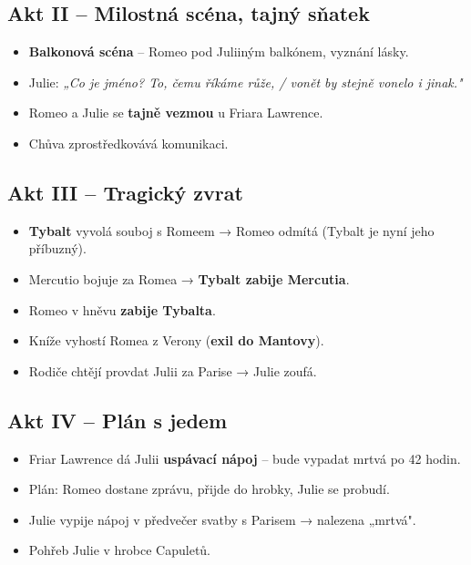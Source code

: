 \documentclass[12pt,a4paper]{article}
\begin{document}
\subsection{Akt II – Milostná scéna, tajný sňatek}
\begin{itemize}[leftmargin=1.5em]
  \item \textbf{Balkonová scéna} – Romeo pod Juliiným balkónem, vyznání lásky.
  \item Julie: \textit{„Co je jméno? To, čemu říkáme růže, / vonět by stejně vonelo i jinak."}
  \item Romeo a Julie se \textbf{tajně vezmou} u Friara Lawrence.
  \item Chůva zprostředkovává komunikaci.
\end{itemize}

\subsection{Akt III – Tragický zvrat}
\begin{itemize}[leftmargin=1.5em]
  \item \textbf{Tybalt} vyvolá souboj s Romeem → Romeo odmítá (Tybalt je nyní jeho příbuzný).
  \item Mercutio bojuje za Romea → \textbf{Tybalt zabije Mercutia}.
  \item Romeo v hněvu \textbf{zabije Tybalta}.
  \item Kníže vyhostí Romea z Verony (\textbf{exil do Mantovy}).
  \item Rodiče chtějí provdat Julii za Parise → Julie zoufá.
\end{itemize}

\subsection{Akt IV – Plán s jedem}
\begin{itemize}[leftmargin=1.5em]
  \item Friar Lawrence dá Julii \textbf{uspávací nápoj} – bude vypadat mrtvá po 42 hodin.
  \item Plán: Romeo dostane zprávu, přijde do hrobky, Julie se probudí.
  \item Julie vypije nápoj v předvečer svatby s Parisem → nalezena „mrtvá".
  \item Pohřeb Julie v hrobce Capuletů.
\end{itemize}
\end{document}
